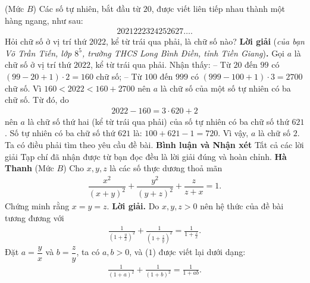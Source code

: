\begin{multicols}{2}
	\setlength{\abovedisplayskip}{4pt}
	\setlength{\belowdisplayskip}{4pt}
	{}
	(Mức $B$) Các số tự nhiên, bắt đầu từ $20$, được viết liên tiếp nhau thành một hàng ngang, như sau:
	\begin{align*}
		2021222324252627\ldots.
	\end{align*}
	Hỏi chữ số ở vị trí thứ $2022$, kể từ trái qua phải, là chữ số nào?
	\vskip 0.05cm
	\textbf{\color{thachthuctoanhoc}Lời giải} (\textit{của bạn Võ Trần Tiến, lớp $8^5$, trường THCS Long Bình Điền, tỉnh Tiền Giang})\textbf{\color{thachthuctoanhoc}.}
	\vskip 0.05cm
	Gọi $a$ là chữ số ở vị trí thứ $2022$, kể từ trái qua phải.
	\vskip 0.05cm
	Nhận thấy:
	\vskip 0.05cm
	-- Từ $20$ đến $99$ có $(99-20 + 1) \cdot 2 = 160$ chữ số;
	\vskip 0.05cm
	-- Từ $100$ đến $999$ có  $(999 -100+1)\cdot 3 = 2700$ chữ số.
	\vskip 0.05cm
	Vì $160 < 2022 < 160 + 2700$ nên $a$ là chữ số của một số tự nhiên có ba chữ số.
	\vskip 0.05cm
	Từ đó, do
	\begin{align*}
		2022 - 160 = 3 \cdot 620 + 2
	\end{align*}
	nên $a$ là chữ số thứ hai (kể từ trái qua phải) của số tự nhiên có ba chữ số thứ $621$.
	\vskip 0.05cm
	Số tự nhiên có ba chữ số thứ $621$ là: $100 + 621 - 1 = 720$.
	\vskip 0.05cm
	Vì vậy, $a$ là chữ số $2$.
	\vskip 0.05cm
	Ta có điều phải tìm theo yêu cầu đề bài.
	\vskip 0.05cm
	\textbf{\color{thachthuctoanhoc}Bình luận và Nhận xét}
	\vskip 0.05cm	
	Tất cả các lời giải Tạp chí đã nhận được từ bạn đọc đều là lời giải đúng và hoàn chỉnh.
	\vskip 0.05cm
	\hfill	\textbf{\color{thachthuctoanhoc}Hà Thanh}
	\vskip 0.05cm
	{}
	(Mức $B$) Cho $x,y,z$ là các số thực dương thoả mãn 
	\begin{align*}
		\dfrac{x^2}{(x+y)^2}+\dfrac{y^2}{(y+z)^2}+\dfrac z{z+x}=1.
	\end{align*}
	Chứng minh rằng $x=y=z$. 
	\vskip 0.05cm
	\textbf{\color{thachthuctoanhoc}Lời giải.}
	Do $x, y, z > 0$ nên hệ thức của đề bài tương đương với
	\begin{align*}
		\frac{1}{{{{\left( {1 + \frac{y}{x}} \right)}^2}}} + \frac{1}{{{{\left( {1 + \frac{z}{y}} \right)}^2}}} = \frac{1}{{1 + \frac{z}{x}}}.\tag{$1$}
	\end{align*}
	Đặt $a = \dfrac{y}{x}$  và  $b = \dfrac{z}{y}$, ta có $a, b > 0$, và ($1$) được viết lại dưới dạng:
	\begin{align*}
		\frac{1}{{{{\left( {1 + a} \right)}^2}}} + \frac{1}{{{{\left( {1 + b} \right)}^2}}} = \frac{1}{{1 + ab}}.\tag{$2$}

\end{align*}
\end{multicols}
